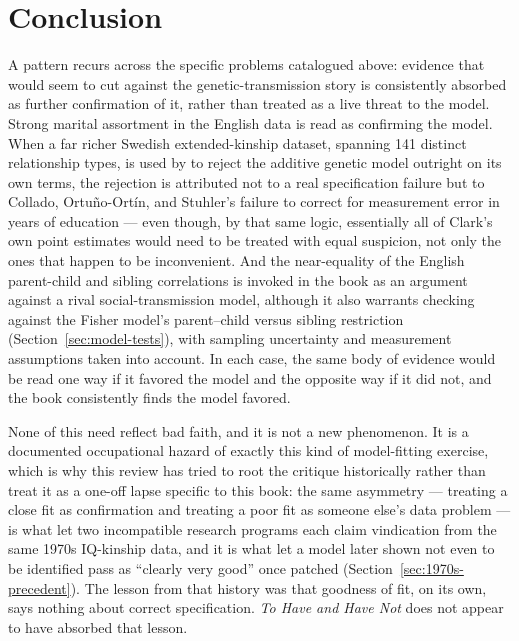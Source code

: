 \documentclass[12pt]{article}
\begin{document}
\section{Conclusion}

A pattern recurs across the specific problems catalogued above: evidence that
would seem to cut against the genetic-transmission story is consistently
absorbed as further confirmation of it, rather than treated as a live threat
to the model. Strong marital assortment in the English data is read as
confirming the model. When a far richer Swedish extended-kinship dataset,
spanning 141 distinct relationship types, is used by \citet{ColladoEtAl2023}
to reject the additive genetic model outright on its own terms, the
rejection is attributed not to a real specification failure but to Collado,
Ortu\~no-Ort\'in, and Stuhler's failure to correct for measurement error in
years of education --- even though, by that same logic, essentially all of
Clark's own point estimates would need to be treated with equal suspicion,
not only the ones that happen to be inconvenient. And the near-equality of
the English parent-child and sibling correlations is invoked in the book as
an argument against a rival social-transmission model, although it also
warrants checking against the Fisher model's parent--child versus sibling
restriction (Section~\ref{sec:model-tests}), with sampling uncertainty and
measurement assumptions taken into account. In each case, the same body of
evidence would be read one way if it favored the model and the opposite way
if it did not, and the book consistently finds the model favored.

None of this need reflect bad faith, and it is not a new phenomenon. It is a
documented occupational hazard of exactly this kind of model-fitting
exercise, which is why this review has tried to root the critique
historically rather than treat it as a one-off lapse specific to this book:
the same asymmetry --- treating a close fit as confirmation and treating a
poor fit as someone else's data problem --- is what let two incompatible
research programs each claim vindication from the same 1970s IQ-kinship
data, and it is what let a model later shown not even to be identified pass
as ``clearly very good'' once patched (Section~\ref{sec:1970s-precedent}). The lesson from that
history was that goodness of fit, on its own, says nothing about correct
specification. \emph{To Have and Have Not} does not appear to have absorbed
that lesson.
\end{document}
